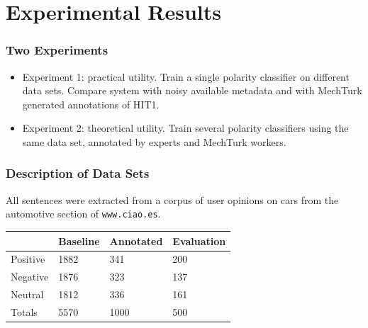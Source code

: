 \documentclass[10pt]{beamer}
\newenvironment{itemwide}%
{\begin{itemize}%
    \setlength{\itemsep}{5pt}%
    \setlength{\parskip}{5pt}}%
  {\end{itemize}}
\begin{document}
\section{Experimental Results}

\begin{frame}
  \frametitle{Two Experiments}
\begin{itemwide}
 \item Experiment 1: practical utility. Train a single polarity classifier on different data sets. Compare system with noisy available metadata and with MechTurk generated annotations of HIT1.
 \item Experiment 2: theoretical utility. Train several polarity classifiers using the same data set, annotated by experts and MechTurk workers.
\end{itemwide}

\end{frame}

\begin{frame}
  \frametitle{Description of Data Sets}

All sentences were extracted from a corpus of user opinions on cars from the automotive section of \texttt{www.ciao.es}.


\vspace{1cm}

\begin{center}
\begin{tabular}{|l|l|l|l|}
\hline
&Baseline &Annotated &Evaluation \\
\hline
Positive &1882 &341 &200 \\
\hline
Negative &1876 &323 &137 \\
\hline
Neutral &1812 &336 &161 \\
\hline
Totals &5570 &1000 &500 \\
\hline
\end{tabular}
\end{center}

\end{frame}
\end{document}
